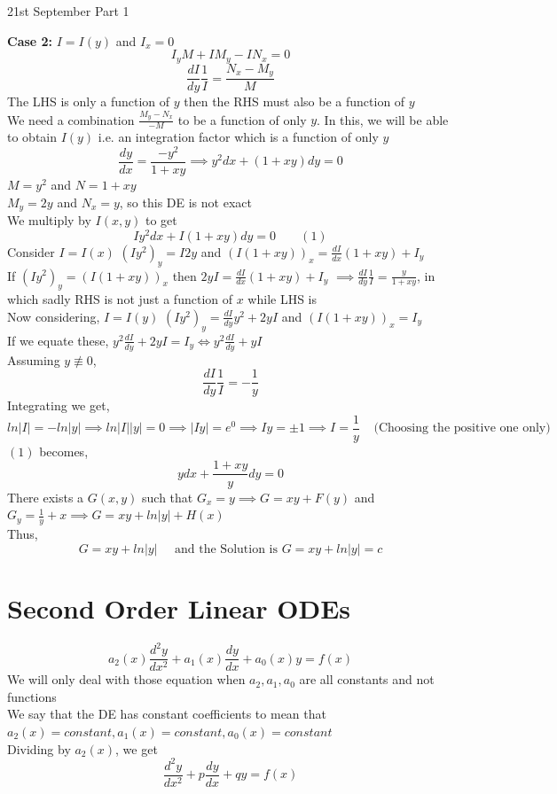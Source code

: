 \documentclass[11pt]{article}
\theoremstyle{definition}
\begin{document}
\begin{center}
    {\LARGE 21st September Part 1}\\
\end{center}
\textbf{Case 2:}  $I = I(y)$ and $I_x = 0$
$$I_yM + IM_y -IN_x = 0$$
$$\frac{dI}{dy}\frac{1}{I} = \frac{N_x-M_y}{M}$$
The LHS is only a function of $y$ then the RHS must also be a function of $y$\\
We need a combination $\frac{M_y-N_x}{-M}$ to be a function of only $y$. In this, we will be able to obtain $I(y)$ i.e. an integration factor which is a function of only $y$\\
$$\frac{dy}{dx} = \frac{-y^2}{1+xy} \implies y^2dx + (1+xy)dy = 0$$
$M = y^2$ and $N=1+xy$\\
$M_y = 2y$ and $N_x = y$, so this DE is not exact\\
We multiply by $I(x,y)$ to get $$Iy^2dx + I(1+xy)dy = 0 \;\;\;\;\;\;\; (1)$$
Consider $I = I(x)$
$(Iy^2)_y = I2y$ and $(I(1+xy))_x =  \frac{dI}{dx}(1+xy) + I_y$\\
If $(Iy^2)_y = (I(1+xy))_x$ then $2yI = \frac{dI}{dx}(1+xy) + I_y$
$\implies \frac{dI}{dy}\frac{1}{I} = \frac{y}{1+xy}$, in which sadly RHS is not just a function of $x$ while LHS is\\
Now considering, $I = I(y)$
$(Iy^2)_y = \frac{dI}{dy}y^2 + 2yI$ and $(I(1+xy))_x = I_y $\\
If we equate these, $y^2\frac{dI}{dy} + 2yI = I_y \Longleftrightarrow y^2\frac{dI}{dy} + yI$\\
Assuming $y \not \equiv 0$,
$$\frac{dI}{dy}\frac{1}{I} = -\frac{1}{y}$$
Integrating we get, 
$$ln|I| = -ln|y| \implies ln|I||y| = 0 \implies |Iy| = e^0 \implies Iy = \pm 1 \implies I = \frac{1}{y} \;\;\;\; \text{(Choosing the positive one only)}$$
$(1)$ becomes, 
$$ydx + \frac{1+xy}{y}dy = 0$$
There exists a $G(x,y)$ such that 
$G_x = y \implies G= xy + F(y)$ and $G_y = \frac{1}{y} + x \implies G = xy + ln|y| + H(x)$\\
Thus, 
$$G = xy + ln|y| \;\;\;\;\; \text{and the Solution is } G = xy + ln|y| = c$$
\section{Second Order Linear ODEs}
$$a_2(x)\frac{d^2y}{dx^2} + a_1(x)\frac{dy}{dx} + a_0(x)y = f(x)$$
We will only deal with those equation when $a_2, a_1, a_0$ are all constants and not functions\\
We say that the DE has constant coefficients to mean that $a_2(x) = constant, a_1(x) = constant, a_0(x) = constant$\\
Dividing by $a_2(x)$, we get $$\frac{d^2y}{dx^2} + p\frac{dy}{dx} + qy = f(x)$$
\end{document}
